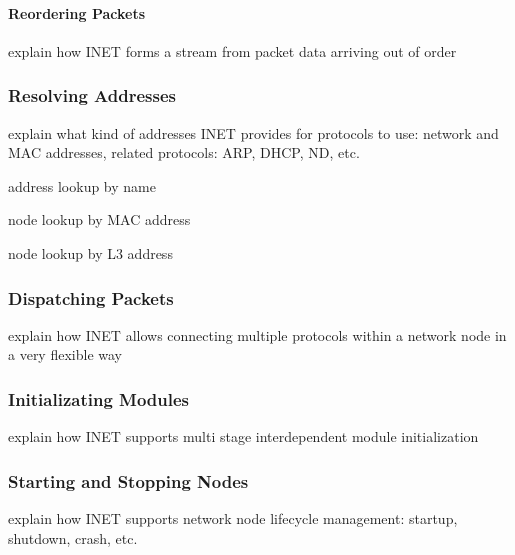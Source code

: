 
\paragraph{Reordering Packets}

explain how INET forms a stream from packet data arriving out of order


\subsubsection*{Resolving Addresses}

explain what kind of addresses INET provides for protocols to use: network
and MAC addresses, related protocols: ARP, DHCP, ND, etc.

address lookup by name

node lookup by MAC address

node lookup by L3 address


\subsubsection*{Dispatching Packets}

explain how INET allows connecting multiple protocols within a network node in a very flexible way



\subsubsection*{Initializating Modules}

explain how INET supports multi stage interdependent module initialization



\subsubsection*{Starting and Stopping Nodes}

explain how INET supports network node lifecycle management: startup, shutdown, crash, etc.



